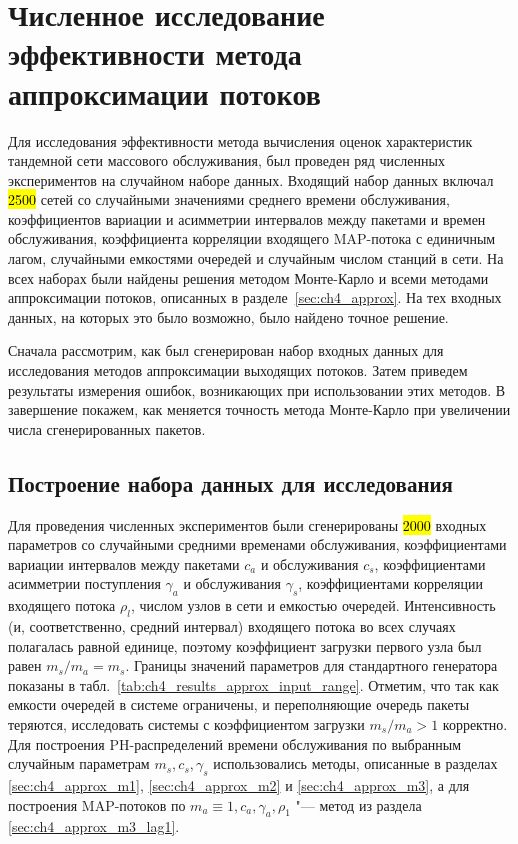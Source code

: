 \section{Численное исследование эффективности метода аппроксимации потоков}

Для исследования эффективности метода вычисления оценок характеристик тандемной сети массового обслуживания, был проведен ряд численных экспериментов на случайном наборе данных. Входящий набор данных включал \hl{2500} сетей со случайными значениями среднего времени обслуживания, коэффициентов вариации и асимметрии интервалов между пакетами и времен обслуживания, коэффициента корреляции входящего MAP-потока с единичным лагом, случайными емкостями очередей и случайным числом станций в сети. На всех наборах были найдены решения методом Монте-Карло и всеми методами аппроксимации потоков, описанных в разделе~\ref{sec:ch4_approx}. На тех входных данных, на которых это было возможно, было найдено точное решение.

Сначала рассмотрим, как был сгенерирован набор входных данных для исследования методов аппроксимации выходящих потоков. Затем приведем результаты измерения ошибок, возникающих при использовании этих методов. В завершение покажем, как меняется точность метода Монте-Карло при увеличении числа сгенерированных пакетов.


\subsection{Построение набора данных для исследования}

Для проведения численных экспериментов были сгенерированы \hl{2000} входных параметров со случайными средними временами обслуживания, коэффициентами вариации интервалов между пакетами $c_a$ и обслуживания $c_s$, коэффициентами асимметрии поступления $\gamma_a$ и обслуживания $\gamma_s$, коэффициентами корреляции входящего потока $\rho_l$, числом узлов в сети и емкостью очередей. Интенсивность (и, соответственно, средний интервал) входящего потока во всех случаях полагалась равной единице, поэтому коэффициент загрузки первого узла был равен $m_s / m_a = m_s$. Границы значений параметров для стандартного генератора показаны в табл.~\ref{tab:ch4_results_approx_input_range}. Отметим, что так как емкости очередей в системе ограничены, и переполняющие очередь пакеты теряются, исследовать системы с коэффициентом загрузки $m_s / m_a > 1$ корректно. Для построения PH-распределений времени обслуживания по выбранным случайным параметрам $m_s, c_s, \gamma_s$ использовались методы, описанные в разделах \ref{sec:ch4_approx_m1}, \ref{sec:ch4_approx_m2} и \ref{sec:ch4_approx_m3}, а для построения MAP-потоков по $m_a \equiv 1, c_a, \gamma_a, \rho_1$ "--- метод из раздела \ref{sec:ch4_approx_m3_lag1}.

